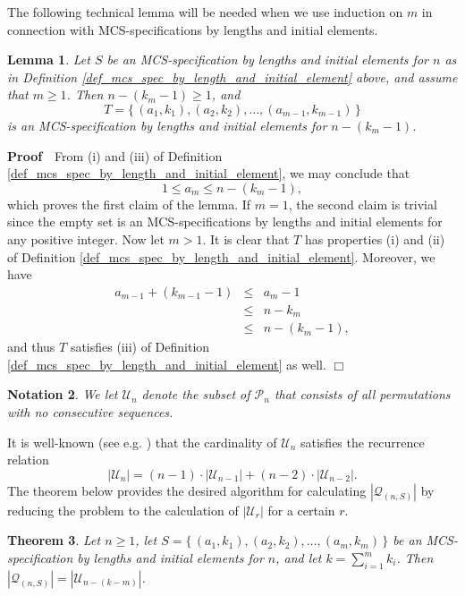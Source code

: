 \documentclass{article}
\newtheorem{theorem}{Theorem}[section]
\newtheorem{lemma}[theorem]{Lemma}
\newtheorem{notation}[theorem]{Notation}
\def\proof{\par \noindent              %
\mbox{\bf Proof}\ \,}                  %
\def\endproof{\mbox{$\Box$} \par }     %
\begin{document}
The following technical lemma will be needed when we use induction on $m$ in connection with
MCS-specifications by lengths and initial elements.

\begin{lemma}\label{lemma_ind_on_m} 
  Let $S$ be an MCS-specification by lengths and initial elements for $n$ as in
  Definition \ref{def_mcs_spec_by_length_and_initial_element}
  above, and assume that $m\geq 1$. Then $n-(k_m-1) \geq 1$, and
  $$T = \{\,(a_1, k_1), (a_2, k_2), \ldots,(a_{m-1}, k_{m-1})\,\}$$
  is an MCS-specification by lengths and initial elements for $n-(k_m-1)$.
\end{lemma}

\proof
From (i) and (iii) of Definition \ref{def_mcs_spec_by_length_and_initial_element}, we may conclude that
$$1 \leq a_m \leq n - (k_m - 1),$$ which proves the first claim of the lemma.
If $m=1$, the second claim is trivial since the empty set is an MCS-specifications by lengths
and initial elements for any positive integer. Now let $m > 1$. It is clear that $T$ has properties
(i) and (ii) of Definition \ref{def_mcs_spec_by_length_and_initial_element}. Moreover, we have 
\begin{eqnarray*}
  a_{m-1} + (k_{m-1} - 1) & \leq & a_m - 1 \\
                          & \leq & n - k_m \\
                          & \leq & n - (k_m-1),
\end{eqnarray*} 
and thus $T$ satisfies (iii) of Definition \ref{def_mcs_spec_by_length_and_initial_element} as well.
\endproof

\begin{notation}
  We let ${\mathcal U}_n$ denote the subset of ${\mathcal P}_n$ that consists of all permutations with no consecutive
  sequences.
\end{notation}

It is well-known (see e.g. \cite{JedYang}) that the cardinality of ${\mathcal U}_n$ satisfies the recurrence relation
$$
|{\mathcal U}_n| = (n-1) \cdot |{\mathcal U}_{n-1}| + (n-2) \cdot |{\mathcal U}_{n-2}|.
$$
The theorem below provides the desired algorithm for calculating $|{\mathcal Q}_{(n,S)}|$ by reducing the
problem to the calculation of $|{\mathcal U}_r|$ for a certain $r$.
 
\begin{theorem}\label{theorem_count_by_length_and_initial_element}
  Let $n \geq 1$, let $S = \{\,(a_1, k_1), (a_2, k_2), \ldots,(a_m, k_m)\,\}$ be an
  MCS-specification by lengths and initial elements for $n$, and let $k = \sum_{i=1}^m k_i$.
  Then $|{\mathcal Q}_{(n,S)}| = |{\mathcal U}_{n - (k - m)}|$.
\end{theorem}
\end{document}
